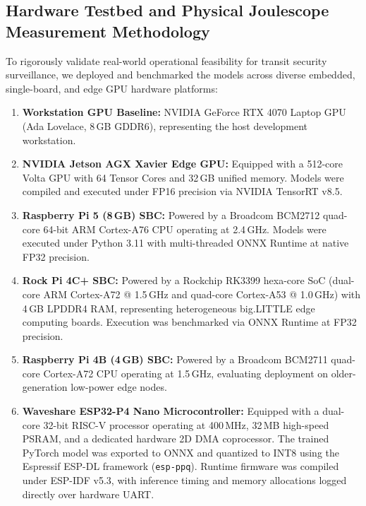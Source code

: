 \documentclass[journal,twoside,web]{ieeecolor}
\begin{document}
\subsection{Hardware Testbed and Physical Joulescope Measurement Methodology}
To rigorously validate real-world operational feasibility for transit security surveillance, we deployed and benchmarked the models across diverse embedded, single-board, and edge GPU hardware platforms:
\begin{enumerate}
    \item \textbf{Workstation GPU Baseline:} NVIDIA GeForce RTX 4070 Laptop GPU (Ada Lovelace, 8\,GB GDDR6), representing the host development workstation.
    \item \textbf{NVIDIA Jetson AGX Xavier Edge GPU:} Equipped with a 512-core Volta GPU with 64 Tensor Cores and 32\,GB unified memory. Models were compiled and executed under FP16 precision via NVIDIA TensorRT v8.5.
    \item \textbf{Raspberry Pi 5 (8\,GB) SBC:} Powered by a Broadcom BCM2712 quad-core 64-bit ARM Cortex-A76 CPU operating at 2.4\,GHz. Models were executed under Python 3.11 with multi-threaded ONNX Runtime at native FP32 precision.
    \item \textbf{Rock Pi 4C+ SBC:} Powered by a Rockchip RK3399 hexa-core SoC (dual-core ARM Cortex-A72 @ 1.5\,GHz and quad-core Cortex-A53 @ 1.0\,GHz) with 4\,GB LPDDR4 RAM, representing heterogeneous big.LITTLE edge computing boards. Execution was benchmarked via ONNX Runtime at FP32 precision.
    \item \textbf{Raspberry Pi 4B (4\,GB) SBC:} Powered by a Broadcom BCM2711 quad-core Cortex-A72 CPU operating at 1.5\,GHz, evaluating deployment on older-generation low-power edge nodes.
    \item \textbf{Waveshare ESP32-P4 Nano Microcontroller:} Equipped with a dual-core 32-bit RISC-V processor operating at 400\,MHz, 32\,MB high-speed PSRAM, and a dedicated hardware 2D DMA coprocessor. The trained PyTorch model was exported to ONNX and quantized to INT8 using the Espressif ESP-DL framework (\texttt{esp-ppq}). Runtime firmware was compiled under ESP-IDF v5.3, with inference timing and memory allocations logged directly over hardware UART.
\end{enumerate}
\end{document}
